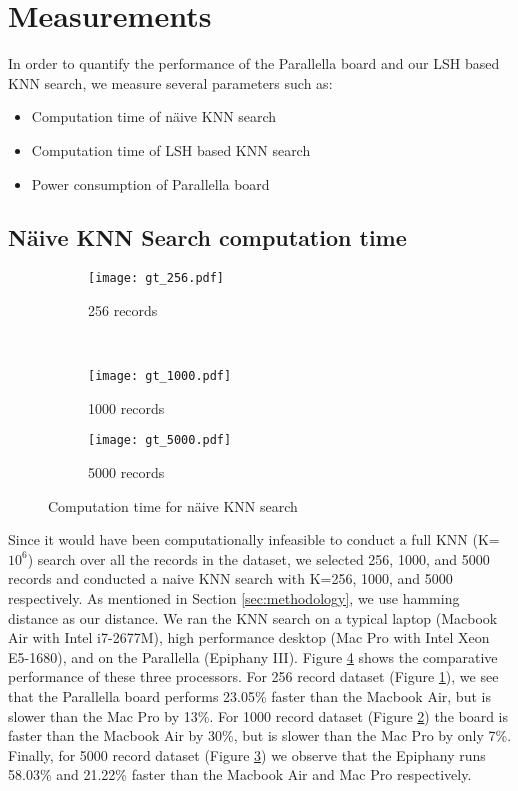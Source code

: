 \section{Measurements}
\label{sec:measurements}
In order to quantify the performance of the Parallella board and our LSH based KNN search, we measure several parameters such as:
\begin{itemize}
\item Computation time of n\"{a}ive KNN search
\item Computation time of LSH based KNN search
\item Power consumption of Parallella board
\end{itemize}
\subsection{N\"{a}ive KNN Search computation time}
\label{subsec:nknn_comptime}
\begin{figure}
\centering
\begin{subfigure}[b]{0.45\textwidth}
	\texttt{[image: gt\_256.pdf]}
	\caption{256 records}
	\label{fig:k256_comptime}
\end{subfigure}
~
\begin{subfigure}[b]{0.45\textwidth}
	\texttt{[image: gt\_1000.pdf]}
	\caption{1000 records}
	\label{fig:k1000_comptime}
\end{subfigure}
\begin{subfigure}[b]{0.45\textwidth}
	\texttt{[image: gt\_5000.pdf]}
	\caption{5000 records}
	\label{fig:k5000_comptime}
\end{subfigure}
\caption{Computation time for n\"{a}ive KNN search}
\label{fig:fullK256_1000_5000}
\end{figure}
Since it would have been computationally infeasible to conduct a full KNN (K=$10^6$) search over all the records in the dataset, we selected 256, 1000, and 5000 records and conducted a naive KNN search with K=256, 1000, and 5000 respectively. 
As mentioned in Section \ref{sec:methodology}, we use hamming distance as our distance. 
We ran the KNN search on a typical laptop (Macbook Air with Intel i7-2677M), high performance desktop (Mac Pro with Intel Xeon E5-1680), and on the Parallella (Epiphany III). 
Figure \ref{fig:fullK256_1000_5000} shows the comparative performance of these three processors. For 256 record dataset (Figure \ref{fig:k256_comptime}), we see that the Parallella board performs 23.05\% faster than the Macbook Air, but is slower than the Mac Pro by 13\%. 
For 1000 record dataset (Figure \ref{fig:k1000_comptime}) the board is faster than the Macbook Air by 30\%, but is slower than the Mac Pro by only 7\%. 
Finally, for 5000 record dataset (Figure \ref{fig:k5000_comptime}) we observe that the Epiphany runs 58.03\% and 21.22\% faster than the Macbook Air and Mac Pro respectively. 

